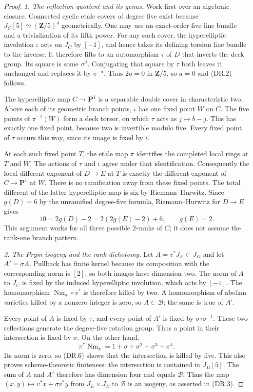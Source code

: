 \documentclass[11pt,a4paper]{article}
\begin{document}
\begin{proof}
\emph{1. The reflection quotient and its genus.}
Work first over an algebraic closure.  Connected cyclic etale covers of
degree five exist because $J_C[5]\simeq(\mathbf Z/5)^4$ geometrically.
One may use an exact-order-five line bundle and a trivialization of its
fifth power.  For any such cover, the hyperelliptic involution $\iota$
acts on $J_C$ by $[-1]$, and hence takes its defining torsion line
bundle to the inverse.  It therefore lifts to an automorphism $\tau$
of $D$ that inverts the deck group.  Its square is some $\sigma^a$.
Conjugating that square by $\tau$ both leaves it unchanged and replaces
it by $\sigma^{-a}$.  Thus $2a=0$ in $\mathbf Z/5$, so $a=0$ and
(DR.2) follows.

The hyperelliptic map $C\to\mathbf P^1$ is a separable double cover in
characteristic two.  Above each of its geometric branch points,
$\iota$ has one fixed point $W$ on $C$.  The five points of
$\pi^{-1}(W)$ form a deck torsor, on which $\tau$ acts as
$j\mapsto b-j$.  This has exactly one fixed point, because two is
invertible modulo five.  Every fixed point of $\tau$ occurs this way,
since its image is fixed by $\iota$.

At each such fixed point $T$, the etale map $\pi$ identifies the
completed local rings at $T$ and $W$.  The actions of $\tau$ and
$\iota$ agree under that identification.  Consequently the local
different exponent of $D\to E$ at $T$ is exactly the different
exponent of $C\to\mathbf P^1$ at $W$.  There is no ramification away
from these fixed points.  The total different of the latter
hyperelliptic map is six by Riemann--Hurwitz.  Since $g(D)=6$ by the
unramified degree-five formula, Riemann--Hurwitz for $D\to E$ gives
\[
                 10=2g(D)-2=2(2g(E)-2)+6,
                 \qquad g(E)=2.
 \tag{DR.5}
\]
This argument works for all three possible $2$-ranks of $C$; it does
not assume the rank-one branch pattern.

\emph{2. The Prym isogeny and the rank dichotomy.}
Let $A=v^*J_E\subset J_D$ and let $A'=\sigma A$.  Pullback has
finite kernel because its composition with the corresponding norm is
$[2]$, so both images have dimension two.  The norm of $A$ to $J_C$
is fixed by the induced hyperelliptic involution, which acts by $[-1]$.
The homomorphism $\operatorname{Nm}_\pi\circ v^*$ is therefore killed
by two.  A homomorphism of abelian varieties killed by a nonzero integer
is zero, so $A\subset\mathcal B$; the same is true of $A'$.

Every point of $A$ is fixed by $\tau$, and every point of $A'$ is fixed
by $\sigma\tau\sigma^{-1}$.  These two reflections generate the
degree-five rotation group.  Thus a point in their intersection is
fixed by $\sigma$.  On the other hand,
\[
 \pi^*\operatorname{Nm}_\pi=1+\sigma+\sigma^2+\sigma^3+\sigma^4.
 \tag{DR.6}
\]
Its norm is zero, so (DR.6) shows that the intersection is killed by
five.  This also proves scheme-theoretic finiteness: the intersection
is contained in $J_D[5]$.  The sum of $A$ and $A'$ therefore has
dimension four and equals $\mathcal B$.  Thus the map
$(x,y)\mapsto v^*x+\sigma v^*y$ from $J_E\times J_E$ to
$\mathcal B$ is an isogeny, as asserted in (DR.3).


\end{proof}
\end{document}
